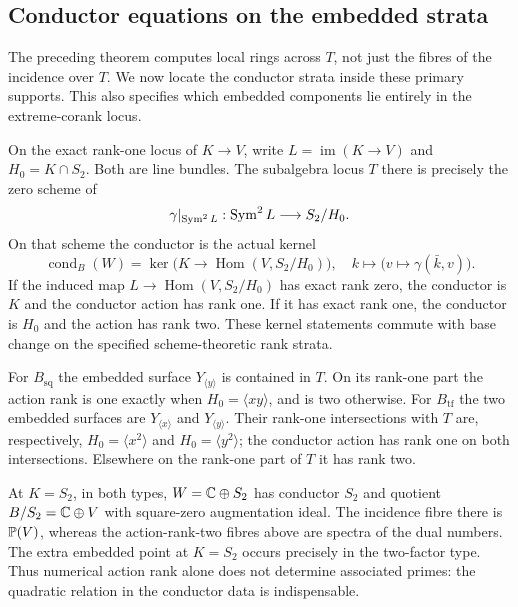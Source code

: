 \subsection{Conductor equations on the embedded strata}
The preceding theorem computes local rings across $T$, not just the
fibres of the incidence over $T$. We now locate the conductor strata
inside these primary supports. This also specifies which embedded
components lie entirely in the extreme-corank locus.

\begin{theorem}
\label{thm:loewy-conductor-boundary}
On the exact rank-one locus of $K\to V$, write
$L=\operatorname{im}(K\to V)$ and $H_0=K\cap S_2$.
Both are line bundles. The subalgebra locus $T$ there is precisely
the zero scheme of
\begin{equation}\label{eq:loewy-subalgebra-equation}
 \gamma|_{\operatorname{Sym}^2L}:\operatorname{Sym}^2L\longrightarrow S_2/H_0.
\end{equation}
On that scheme the conductor is the actual kernel
\begin{equation}\label{eq:loewy-conductor-kernel}
 \operatorname{cond}_B(W)=
 \ker\bigl(K\longrightarrow
         \operatorname{Hom}(V,S_2/H_0)\bigr),
 \quad k\longmapsto\bigl(v\longmapsto\gamma(\bar k,v)\bigr).
\end{equation}
If the induced map $L\to\operatorname{Hom}(V,S_2/H_0)$ has exact
rank zero, the conductor is $K$ and the conductor action has rank
one. If it has exact rank one, the conductor is $H_0$ and the action
has rank two. These kernel statements commute with base change on
the specified scheme-theoretic rank strata.

For $B_{\mathrm{sq}}$ the embedded surface $Y_{\langle y\rangle}$
is contained in $T$. On its rank-one part the action rank is one
exactly when $H_0=\langle xy\rangle$, and is two otherwise.
For $B_{\mathrm{tf}}$ the two embedded surfaces are
$Y_{\langle x\rangle}$ and $Y_{\langle y\rangle}$.
Their rank-one intersections with $T$ are, respectively,
$H_0=\langle x^2\rangle$ and $H_0=\langle y^2\rangle$;
the conductor action has rank one on both intersections.
Elsewhere on the rank-one part of $T$ it has rank two.

At $K=S_2$, in both types, $W=\mathbb C\oplus S_2$ has conductor $S_2$
and quotient $B/S_2=\mathbb C\oplus V$ with square-zero augmentation ideal.
The incidence fibre there is $\mathbb P(V)$, whereas the action-rank-two
fibres above are spectra of the dual numbers. The extra embedded
point at $K=S_2$ occurs precisely in the two-factor type.
Thus numerical action rank alone does not determine associated primes:
the quadratic relation in the conductor data is indispensable.
\end{theorem}
